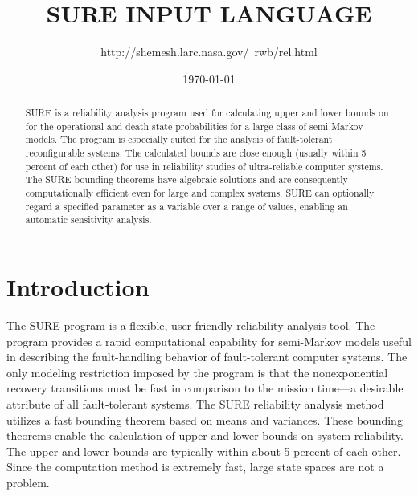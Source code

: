 
\title{\bf SURE INPUT LANGUAGE}
\author{
 http://shemesh.larc.nasa.gov/~rwb/rel.html \\
}
\newcommand{\newtxt}{\rm}
\newcommand{\newt}{\rm}
\newcommand{\isf}{\tt}


\date{ \today}



\maketitle

\begin{abstract}
SURE is a reliability analysis program used for calculating upper and
lower bounds on for the operational and death state probabilities for
a large class of semi-Markov models.  The program is especially suited
for the analysis of fault-tolerant reconfigurable systems.  The
calculated bounds are close enough (usually within 5 percent of each
other) for use in reliability studies of ultra-reliable computer
systems. The SURE bounding theorems have algebraic solutions and are
consequently computationally efficient even for large and complex
systems.  SURE can optionally regard a specified parameter as a
variable over a range of values, enabling an automatic sensitivity
analysis.
\end{abstract}
 
\pagebreak
\tableofcontents
\pagebreak                                             



\section{Introduction}

The SURE program is a flexible, user-friendly reliability analysis tool.  The
program provides a rapid computational capability for semi-Markov models
useful in describing the fault-handling behavior of fault-tolerant computer
systems.  The only modeling restriction imposed by the program is that the
nonexponential recovery transitions must be fast in comparison to the mission
time---a desirable attribute of all fault-tolerant systems.  The SURE
reliability analysis method utilizes a fast bounding theorem based on means
and variances.
These bounding theorems enable the calculation of upper and lower bounds on
system reliability.  The upper and lower bounds are typically within about 5
percent of each other.  Since the computation method is extremely fast, large
state spaces are not a problem.

